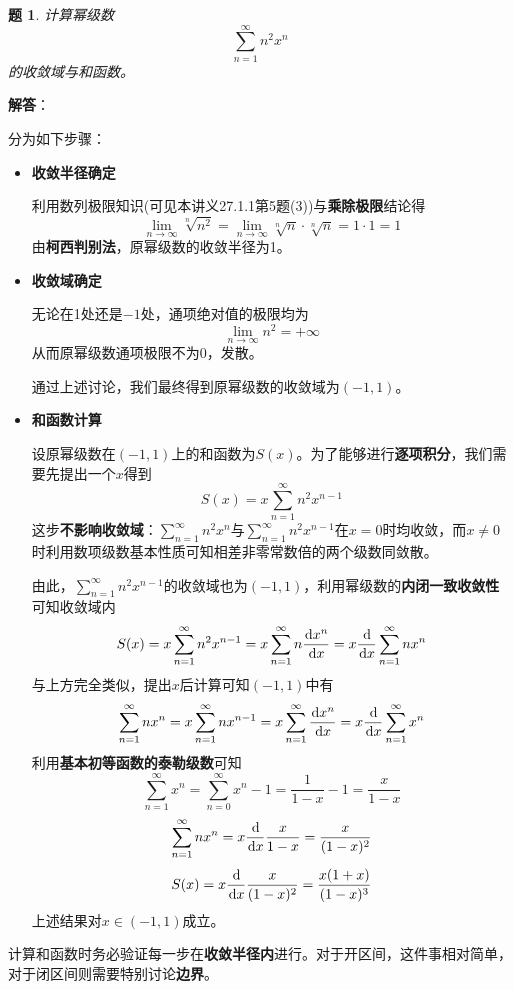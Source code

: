 \documentclass[a4paper,UTF8,fontset=windows,AutoFakeBold]{ctexart}
\newcommand*{\dr}{\hspace{0.07em}\mathrm{d}}
\newcommand*{\suminf}[1][n=1]{\sum_{#1}^\infty}
\newcommand*{\note}{\noindent *}
\theoremstyle{ex}
\newtheorem{exercise}{题}
\newcommand{\sol}[1]{{\vspace{5pt}\kaishu\noindent\textbf{解答}：\vspace{-3pt}
\begin{compactitem}
    \item[] #1
\end{compactitem}
}}
\begin{document}
\begin{framed}
\begin{exercise}
    计算幂级数
    $$\suminf n^2x^n$$
    的收敛域与和函数。
\end{exercise}
\sol{
    分为如下步骤：
    \begin{itemize}
        \item \textbf{收敛半径确定}
        
        利用数列极限知识(可见本讲义27.1.1第5题(3))与\textbf{乘除极限}结论得
        $$\lim_{n\to\infty}\sqrt[n]{n^2}=\lim_{n\to\infty}\sqrt[n]{n}\cdot\sqrt[n]{n}=1\cdot1=1$$
        由\textbf{柯西判别法}，原幂级数的收敛半径为1。

        \item \textbf{收敛域确定}
        
        无论在1处还是$-1$处，通项绝对值的极限均为
        $$\lim_{n\to\infty}n^2=+\infty$$
        从而原幂级数通项极限不为0，发散。

        通过上述讨论，我们最终得到原幂级数的收敛域为$(-1,1)$。

        \item \textbf{和函数计算}
        
        设原幂级数在$(-1,1)$上的和函数为$S(x)$。为了能够进行\textbf{逐项积分}，我们需要先提出一个$x$得到
        $$S(x)=x\suminf n^2x^{n-1}$$
        这步\textbf{不影响收敛域}：$\suminf n^2x^n$与$\suminf n^2x^{n-1}$在$x=0$时均收敛，而$x\ne0$时利用数项级数基本性质可知相差非零常数倍的两个级数同敛散。

        由此，$\suminf n^2x^{n-1}$的收敛域也为$(-1,1)$，利用幂级数的\textbf{内闭一致收敛性}可知收敛域内
        $$S(x)=x\suminf n^2x^{n-1}=x\suminf n\frac{\dr x^n}{\dr x}=x\frac{\dr}{\dr x}\suminf nx^n$$
        与上方完全类似，提出$x$后计算可知$(-1,1)$中有
        $$\suminf nx^n=x\suminf nx^{n-1}=x\suminf\frac{\dr x^n}{\dr x}=x\frac{\dr}{\dr x}\suminf x^n$$
        利用\textbf{基本初等函数的泰勒级数}可知
        $$\suminf x^n=\suminf[n=0]x^n-1=\frac{1}{1-x}-1=\frac{x}{1-x}$$
        $$\suminf nx^n=x\frac{\dr}{\dr x}\frac{x}{1-x}=\frac{x}{(1-x)^2}$$
        $$S(x)=x\frac{\dr}{\dr x}\frac{x}{(1-x)^2}=\frac{x(1+x)}{(1-x)^3}$$
        上述结果对$x\in(-1,1)$成立。
    \end{itemize}
}
\end{framed}

\note 计算和函数时务必验证每一步在\textbf{收敛半径内}进行。对于开区间，这件事相对简单，对于闭区间则需要特别讨论\textbf{边界}。
\end{document}
